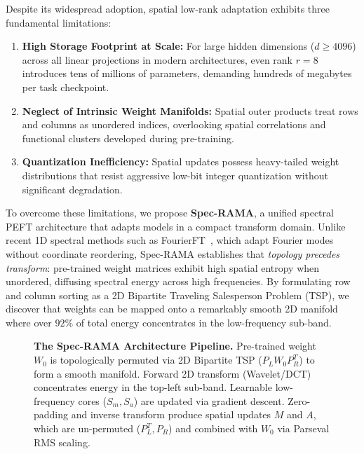 \documentclass{article}
\begin{document}
Despite its widespread adoption, spatial low-rank adaptation exhibits three fundamental limitations:
\begin{enumerate}
    \item \textbf{High Storage Footprint at Scale:} For large hidden dimensions ($d \ge 4096$) across all linear projections in modern architectures, even rank $r=8$ introduces tens of millions of parameters, demanding hundreds of megabytes per task checkpoint.
    \item \textbf{Neglect of Intrinsic Weight Manifolds:} Spatial outer products treat rows and columns as unordered indices, overlooking spatial correlations and functional clusters developed during pre-training.
    \item \textbf{Quantization Inefficiency:} Spatial updates possess heavy-tailed weight distributions that resist aggressive low-bit integer quantization without significant degradation.
\end{enumerate}

To overcome these limitations, we propose \textbf{Spec-RAMA}, a unified spectral PEFT architecture that adapts models in a compact transform domain. Unlike recent 1D spectral methods such as FourierFT~\cite{gao2024fourierft}, which adapt Fourier modes without coordinate reordering, Spec-RAMA establishes that \textit{topology precedes transform}: pre-trained weight matrices exhibit high spatial entropy when unordered, diffusing spectral energy across high frequencies. By formulating row and column sorting as a 2D Bipartite Traveling Salesperson Problem (TSP), we discover that weights can be mapped onto a remarkably smooth 2D manifold where over $92\%$ of total energy concentrates in the low-frequency sub-band.

\begin{figure}[t]
\centering
\fbox{\rule{0pt}{2in} \rule{0.9\linewidth}{0pt}}
\caption{\textbf{The Spec-RAMA Architecture Pipeline.} Pre-trained weight $W_0$ is topologically permuted via 2D Bipartite TSP ($P_L W_0 P_R^T$) to form a smooth manifold. Forward 2D transform (Wavelet/DCT) concentrates energy in the top-left sub-band. Learnable low-frequency cores ($S_m, S_a$) are updated via gradient descent. Zero-padding and inverse transform produce spatial updates $M$ and $A$, which are un-permuted ($P_L^T, P_R$) and combined with $W_0$ via Parseval RMS scaling.}
\label{fig:architecture}
\end{figure}
\end{document}
